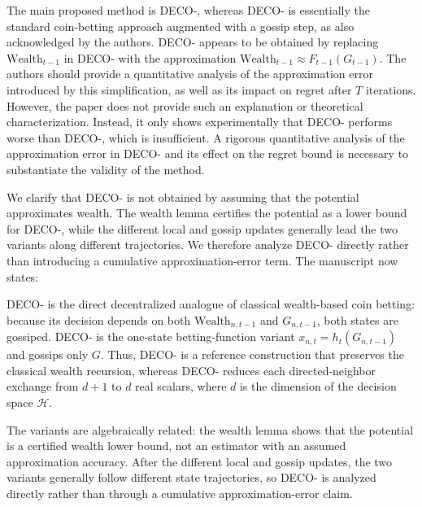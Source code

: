 \documentclass[12pt,english]{reviewresponse}
\newcommand{\algname}{{DECO}\xspace}
\newcommand{\w}{\text{Wealth}}
\newcommand{\Hil}{\mathcal{H}}
\begin{document}
\begin{revcomment}
    The main proposed method is \algname{}-, whereas \algname{}- is essentially the standard coin-betting approach augmented with a gossip step, as also acknowledged by the authors. \algname{}- appears to be obtained by replacing $\text{Wealth}_{t-1}$ in \algname{}- with the approximation $\text{Wealth}_{t-1} \approx F_{t-1}(G_{t-1})$. The authors should provide a quantitative analysis of the approximation error introduced by this simplification, as well as its impact on regret after $T$ iterations. However, the paper does not provide such an explanation or theoretical characterization. Instead, it only shows experimentally that \algname{}- performs worse than \algname{}-, which is insufficient. A rigorous quantitative analysis of the approximation error in \algname{}- and its effect on the regret bound is necessary to substantiate the validity of the method.
\end{revcomment}
\begin{revresponse}
    We clarify that \algname{}- is not obtained by assuming that the potential approximates wealth.  The wealth lemma certifies the potential as a lower bound for \algname{}-, while the different local and gossip updates generally lead the two variants along different trajectories.  We therefore analyze \algname{}- directly rather than introducing a cumulative approximation-error term.
    The manuscript now states:
    \begin{changes}
        \algname{}- is the direct decentralized analogue of classical wealth-based coin betting: because its decision depends on both $\w_{n,t-1}$ and $G_{n,t-1}$, both states are gossiped.
        \algname{}- is the one-state betting-function variant $x_{n,t}=h_t(G_{n,t-1})$ and gossips only $G$.
        Thus, \algname{}- is a reference construction that preserves the classical wealth recursion, whereas \algname{}- reduces each directed-neighbor exchange from $d+1$ to $d$ real scalars, where $d$ is the dimension of the decision space $\Hil$.

        The variants are algebraically related: the wealth lemma shows that the potential is a certified wealth lower bound, not an estimator with an assumed approximation accuracy. After the different local and gossip updates, the two variants generally follow different state trajectories, so \algname{}- is analyzed directly rather than through a cumulative approximation-error claim.
    \end{changes}
\end{revresponse}
\end{document}
